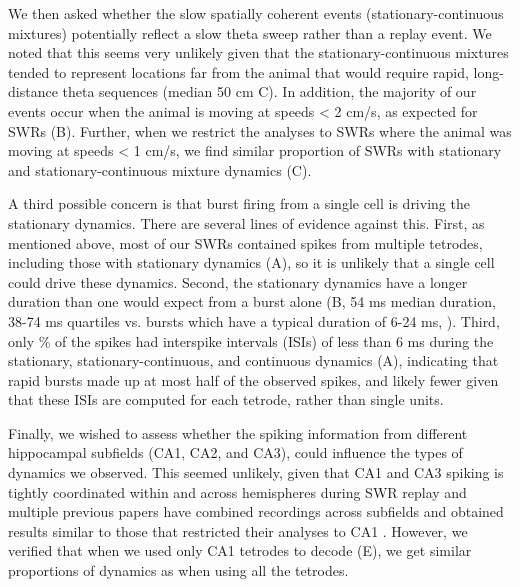 \documentclass[9pt,lineno]{elife}
\begin{document}
We then asked whether the slow spatially coherent events (stationary-continuous mixtures) potentially reflect a slow theta sweep rather than a replay event. We noted that this seems very unlikely given that the stationary-continuous mixtures tended to represent locations far from the animal that would require rapid, long-distance theta sequences (median 50 cm C). In addition, the majority of our events occur when the animal is moving at speeds < 2 cm/s, as expected for SWRs (B). Further, when we restrict the analyses to SWRs where the animal was moving at speeds < 1 cm/s, we find similar proportion of SWRs with stationary and stationary-continuous mixture dynamics (C).

A third possible concern is that burst firing from a single cell is driving the stationary dynamics. There are several lines of evidence against this. First, as mentioned above, most of our SWRs contained spikes from multiple tetrodes, including those with stationary dynamics (A), so it is unlikely that a single cell could drive these dynamics. Second, the stationary dynamics have a longer duration than one would expect from a burst alone (B, 54 ms median duration, 38-74 ms quartiles vs. bursts which have a typical duration of 6-24 ms, \citep{RanckJrStudiessingleneurons1973, HarrisTemporalInteractionSingle2001, TroppSneiderDifferentialbehavioralstatedependence2006}). Third, only \% of the spikes had interspike intervals (ISIs) of less than 6 ms during the stationary, stationary-continuous, and continuous dynamics (A), indicating that rapid bursts made up at most half of the observed spikes, and likely fewer given that these ISIs are computed for each tetrode, rather than single units.

Finally, we wished to assess whether the spiking information from different hippocampal subfields (CA1, CA2, and CA3), could influence the types of dynamics we observed. This seemed unlikely, given that CA1 and CA3 spiking is tightly coordinated within and across hemispheres during SWR replay \citep{CarrTransientSlowGamma2012} and multiple previous papers have combined recordings across subfields and obtained results similar to those that restricted their analyses to CA1 \citep{DibaForwardreversehippocampal2007a, KarlssonAwakereplayremote2009}. However, we verified that when we used only CA1 tetrodes to decode (E), we get similar proportions of dynamics as when using all the tetrodes.
\end{document}
